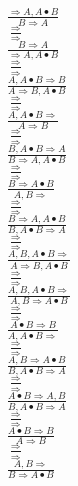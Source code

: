 \documentclass[11pt]{article}
\begin{document}
\begin{center}
\bigskip
\\$\frac{\Rightarrow A, A\bullet B}{B\Rightarrow A}$
\bigskip
\\$\frac{\Rightarrow }{\Rightarrow }$
\bigskip
\\$\frac{B\Rightarrow A}{\Rightarrow A, A\bullet B}$
\bigskip
\\$\frac{\Rightarrow }{\Rightarrow }$
\bigskip
\\$\frac{A, A\bullet B\Rightarrow B}{A\Rightarrow B, A\bullet B}$
\bigskip
\\$\frac{\Rightarrow }{\Rightarrow }$
\bigskip
\\$\frac{A, A\bullet B\Rightarrow }{A\Rightarrow B}$
\bigskip
\\$\frac{\Rightarrow }{\Rightarrow }$
\bigskip
\\$\frac{B, A\bullet B\Rightarrow A}{B\Rightarrow A, A\bullet B}$
\bigskip
\\$\frac{\Rightarrow }{\Rightarrow }$
\bigskip
\\$\frac{B\Rightarrow A\bullet B}{A, B\Rightarrow }$
\bigskip
\\$\frac{\Rightarrow }{\Rightarrow }$
\bigskip
\\$\frac{B\Rightarrow A, A\bullet B}{B, A\bullet B\Rightarrow A}$
\bigskip
\\$\frac{\Rightarrow }{\Rightarrow }$
\bigskip
\\$\frac{A, B, A\bullet B\Rightarrow }{A\Rightarrow B, A\bullet B}$
\bigskip
\\$\frac{\Rightarrow }{\Rightarrow }$
\bigskip
\\$\frac{A, B, A\bullet B\Rightarrow }{A, B\Rightarrow A\bullet B}$
\bigskip
\\$\frac{\Rightarrow }{\Rightarrow }$
\bigskip
\\$\frac{A\bullet B\Rightarrow B}{A, A\bullet B\Rightarrow }$
\bigskip
\\$\frac{\Rightarrow }{\Rightarrow }$
\bigskip
\\$\frac{A, B\Rightarrow A\bullet B}{B, A\bullet B\Rightarrow A}$
\bigskip
\\$\frac{\Rightarrow }{\Rightarrow }$
\bigskip
\\$\frac{A\bullet B\Rightarrow A, B}{B, A\bullet B\Rightarrow A}$
\bigskip
\\$\frac{\Rightarrow }{\Rightarrow }$
\bigskip
\\$\frac{A\bullet B\Rightarrow B}{A\Rightarrow B}$
\bigskip
\\$\frac{\Rightarrow }{\Rightarrow }$
\bigskip
\\$\frac{A, B\Rightarrow }{B\Rightarrow A\bullet B}$

\end{center}
\end{document}
